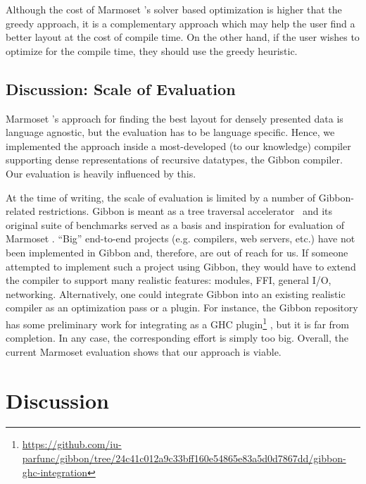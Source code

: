 \documentclass[acmsmall,review,anonymous]{acmart}\settopmatter{printfolios=true,printccs=false,printacmref=false}
\newcommand{\system}{{\sc Marmoset}\xspace}
\providecommand{\DIFaddtex}[1]{{\protect\color{blue} \sf #1}} %
\providecommand{\DIFaddbegin}{} %
\providecommand{\DIFaddend}{} %
\providecommand{\DIFadd}[1]{\texorpdfstring{\DIFaddtex{#1}}{#1}} %
\newcommand{\DIFaddincludegraphics}[2][]{{\color{blue}\fbox{\DIFOincludegraphics[#1]{#2}}}} %
\DeclareRobustCommand{\DIFaddbegin}{\DIFOaddbegin \let\includegraphics\DIFaddincludegraphics} %
\DeclareRobustCommand{\DIFaddend}{\DIFOaddend \let\includegraphics\DIFOincludegraphics} %
\begin{document}
\DIFaddbegin \DIFadd{Although the cost of }\system\DIFadd{'s solver based optimization is higher that the greedy approach, it is a complementary approach 
which may help the user find a better layout at the cost of compile time. On the other hand, if the user wishes to optimize 
for the compile time, they should use the greedy heuristic.
}


\subsection{\DIFadd{Discussion: Scale of Evaluation}}

\system\DIFadd{'s approach for finding the best layout for densely presented
data is language agnostic, but the evaluation has to be language specific.
Hence, we implemented the approach inside a most-developed (to our
knowledge) compiler supporting dense representations of recursive datatypes, the
Gibbon compiler. Our evaluation is heavily influenced by this.
}

\DIFadd{At the time of writing, the scale of evaluation is limited by a number of
Gibbon-related restrictions.
Gibbon is meant as a tree traversal accelerator~\cite{gibbon} and
its original suite of benchmarks served as a basis and inspiration for
evaluation of }\system\DIFadd{.
``Big'' end-to-end projects (e.g. compilers, web servers, etc.)
have not been implemented in Gibbon and, therefore, are out of reach for us.
If someone attempted to implement such a project using Gibbon,
they would have to extend the compiler to support many realistic features:
modules, FFI, general I/O, networking.
Alternatively, one could integrate Gibbon into an existing realistic compiler
as an optimization pass or a plugin.
For instance, the Gibbon repository has some preliminary work for integrating as a
GHC plugin}\footnote{\url{https://github.com/iu-parfunc/gibbon/tree/24c41c012a9c33bff160e54865e83a5d0d7867dd/gibbon-ghc-integration}
}\DIFadd{, but it is far from completion.
In any case, the corresponding effort is simply too big.
Overall, the current }\system \DIFadd{evaluation shows that our approach is viable.
}\label{subsec:heuristic-tradeoffs}







 \DIFaddend \section{Discussion}
\label{sec:discussion}
\end{document}
